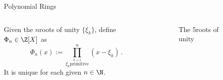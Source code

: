 \begin{frame}{Polynomial Rings}
  \begin{columns}
    \begin{column}{0.6\linewidth}
      \begin{definition}
        Given the $n$\th roots of unity $\{\xi_k\}$, define $\Phi_n \in \Z[X]$ as
        $$\Phi_n(x) := \prod_{\stackrel{k=1}{\xi_k \mathrm{primitive}}}^{n} (x - \xi_k) \,.$$
        It is unique for each given $n \in \N$.
      \end{definition}
    \end{column}
    \begin{column}{0.32\linewidth}
      \begin{figure}
        \caption{The 5\th roots of unity}
        \label{fig:nth-roots-of-unity}
      \end{figure}
    \end{column}
  \end{columns}
\end{frame}
